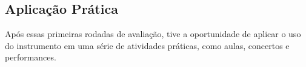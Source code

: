 




\subsection{Aplicação Prática}
Após essas primeiras rodadas de avaliação, tive a oportunidade de aplicar o uso do instrumento em uma série de atividades práticas, como aulas, concertos e performances. 



